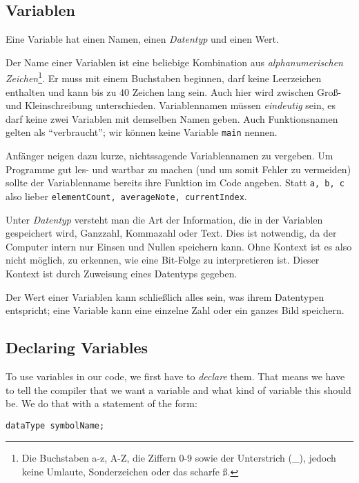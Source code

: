
\subsection{Variablen}
Eine Variable hat einen Namen, einen \emph{Datentyp} und einen Wert.

Der Name einer Variablen ist eine beliebige Kombination aus \emph{alphanumerischen Zeichen}\footnote{Die Buchstaben a-z, A-Z, die Ziffern 0-9 sowie der Unterstrich (\_), jedoch keine Umlaute, Sonderzeichen oder das scharfe ß.}. Er muss mit einem Buchstaben beginnen, darf keine Leerzeichen enthalten und kann bis zu 40 Zeichen lang sein. Auch hier wird zwischen Groß- und Kleinschreibung unterschieden. Variablennamen müssen \emph{eindeutig} sein, \ie es darf keine zwei Variablen mit demselben Namen geben. Auch Funktionsnamen gelten als \enquote{verbraucht}; wir können keine Variable \texttt{main} nennen.

Anfänger neigen dazu kurze, nichtssagende Variablennamen zu vergeben. Um Programme gut les- und wartbar zu machen (und um somit Fehler zu vermeiden) sollte der Variablenname bereits ihre Funktion im Code angeben. Statt \texttt{a, b, c} also lieber \texttt{elementCount, averageNote, currentIndex}.

Unter \emph{Datentyp} versteht man die Art der Information, die in der Variablen gespeichert wird, \eg Ganzzahl, Kommazahl oder Text. Dies ist notwendig, da der Computer intern nur Einsen und Nullen speichern kann. Ohne Kontext ist es also nicht möglich, zu erkennen, wie eine Bit-Folge zu interpretieren ist. Dieser Kontext ist durch Zuweisung eines Datentyps gegeben.

Der Wert einer Variablen kann schließlich alles sein, was ihrem Datentypen entspricht; eine Variable kann \eg eine einzelne Zahl oder ein ganzes Bild speichern.

\subsection{Declaring Variables} \label{sec:DeclareVars}
To use variables in our code, we first have to \emph{declare} them. That means we have to tell the compiler that we want a variable and what kind of variable this should be. We do that with a statement of the form:
\begin{codebox}
\texttt{dataType symbolName;}
\end{codebox}


